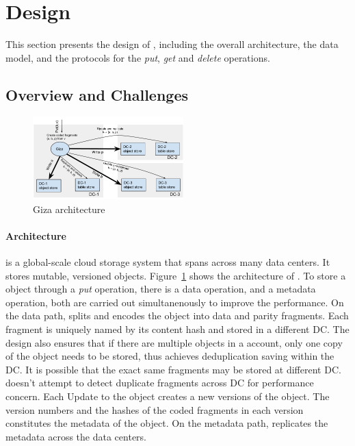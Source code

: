\section{Design}
\label{sec:design}

This section presents the design of {\name}, including the overall architecture,
the data model, and the protocols for the {\em put}, {\em get} and {\em delete} operations.

\subsection{Overview and Challenges}

\begin{figure}[tp]
\centering
\includegraphics[width=0.52\textwidth]{fig/Giza}
\caption{Giza architecture\label{fig:arch}}
\end{figure}

\paragraph{Architecture}
{\name} is a global-scale cloud storage system 
that spans across many data centers.
It stores mutable, versioned objects.
Figure~\ref{fig:arch} shows the architecture of \name. 
To store a \name object through a {\em put} operation,  
there is a data operation, and a metadata operation, both are carried out simultanenously to improve the performance. 
On the data path, \name splits and encodes the object into data and parity fragments.
Each fragment is uniquely named by its content hash
and stored in a different DC.
The design also ensures that if there are multiple objects in a \name account, only one copy of the object needs to be stored, thus achieves deduplication saving within the DC. 
It is possible that the exact same fragments may be stored at different DC. \name doesn't attempt to detect duplicate fragments across DC for performance concern. 
Each Update to the object creates a new versions of the object.
The version numbers and the hashes of the coded fragments in each version
constitutes the metadata of the object.
On the metadata path, \name replicates the metadata across the data centers.

